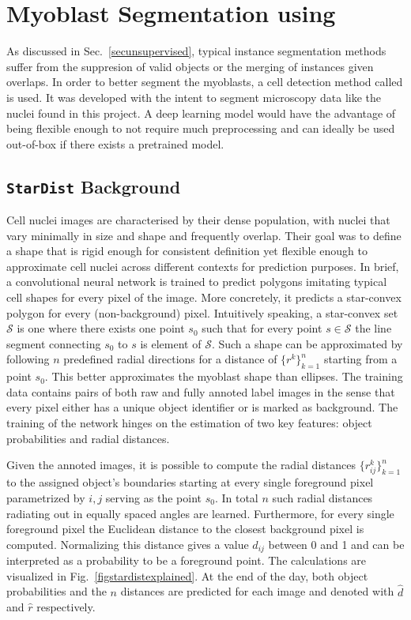 \section{Myoblast Segmentation using \stardist}\label{secstardist}
As discussed in Sec.~\ref{secunsupervised}, typical instance segmentation methods suffer from the suppresion of valid objects or the merging of instances given overlaps. In order to better segment the myoblasts, a cell detection method called \stardist \cite{schmidt2018, weigert2020} is used. It was developed with the intent to segment microscopy data like the nuclei found in this project. A deep learning model would have the advantage of being flexible enough to not require much preprocessing and can ideally be used out-of-box if there exists a pretrained model.
\subsection{\texttt{StarDist} Background}
Cell nuclei images are characterised by their dense population, with nuclei that vary minimally in size and shape and frequently overlap. Their goal was to define a shape that is rigid enough for consistent definition yet flexible enough to approximate cell nuclei across different contexts for prediction purposes. In brief, a convolutional neural network is trained to predict polygons imitating typical cell shapes for every pixel of the image. More concretely, it predicts a star-convex polygon for every (non-background) pixel. Intuitively speaking, a star-convex set $\mathcal{S}$ is one where there exists one point $s_{0}$ such that for every point $s \in \mathcal{S}$ the line segment connecting $s_{0}$ to $s$ is element of $\mathcal{S}$. Such a shape can be approximated by following $n$ predefined radial directions for a distance of $\{r^{k}\}^{n}_{k = 1}$ starting from a point $s_{0}$. This better approximates the myoblast shape than ellipses. The training data contains pairs of both raw and fully annoted label images in the sense that every pixel either has a unique object identifier or is marked as background. The training of the network hinges on the estimation of two key features: object probabilities and radial distances.

Given the annoted images, it is possible to compute the radial distances $\{r^{k}_{ij}\}^{n}_{k = 1}$ to the assigned object's boundaries starting at every single foreground pixel parametrized by $i, j$ serving as the point  $s_{0}$. In total $n$ such radial distances radiating out in equally spaced angles are learned. Furthermore, for every single foreground pixel the Euclidean distance to the closest background pixel is computed. Normalizing this distance gives a value $d_{ij}$ between 0 and 1 and can be interpreted as a probability to be a foreground point. The calculations are visualized in Fig.~\ref{figstardistexplained}. At the end of the day, both object probabilities and the $n$ distances are predicted for each image and denoted with $\hat{d}$ and $\hat{r}$ respectively. 

